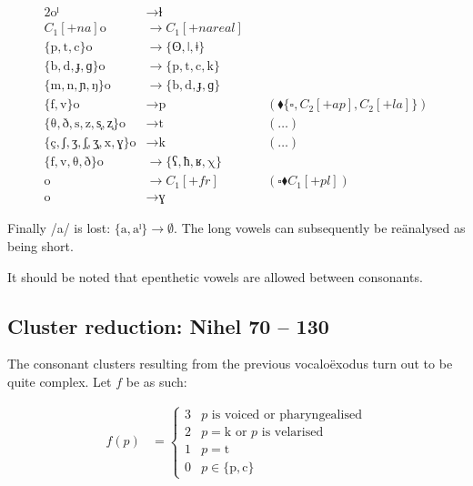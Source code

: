 \documentclass{book}
\begin{document}
\begin{alignat*}{2}
  \text{oˡ} &\rightarrow \text{ɫ} \\
  C_1[+na] \text{o} &\rightarrow C_1[+nareal] \\
  \{\text{p}, \text{t}, \text{c}\} \text{o} &\rightarrow
    \{\text{ʘ}, \text{ǀ}, \text{ǂ}\} \\
  \{\text{b}, \text{d}, \text{ɟ}, \text{ɡ}\} \text{o} &\rightarrow
    \{\text{p}, \text{t}, \text{c}, \text{k}\} \\
  \{\text{m}, \text{n}, \text{ɲ}, \text{ŋ}\} \text{o} &\rightarrow
    \{\text{b}, \text{d}, \text{ɟ}, \text{ɡ}\} \\
  \{\text{f}, \text{v}\} \text{o} &\rightarrow \text{p} &\quad(\blacklozenge \{\square, C_2[+ap], C_2[+la]\}) \\
  \{\text{θ}, \text{ð}, \text{s}, \text{z}, \text{s͎}, \text{z͎}\} \text{o} &\rightarrow \text{t} &\quad(\ldots) \\
  \{\text{ç}, \text{ʃ}, \text{ʒ}, \text{ʃ͎}, \text{ʒ͎}, \text{x}, \text{ɣ}\} \text{o} &\rightarrow \text{k} &\quad(\ldots) \\
  \{\text{f}, \text{v}, \text{θ}, \text{ð}\} \text{o} &\rightarrow
    \{\text{ʕ}, \text{ħ}, \text{ʁ}, \text{χ}\} \\
  \text{o} &\rightarrow C_1[+fr] &\quad(\square \blacklozenge C_1[+pl]) \\
  \text{o} &\rightarrow \text{ɣ}
\end{alignat*}

Finally /a/ is lost: $\{\text{a}, \text{aˡ}\} \rightarrow \emptyset$. The long vowels can subsequently be reänalysed as being short.

It should be noted that epenthetic vowels are allowed between consonants.

\subsection{Cluster reduction: Nihel 70 -- 130}

The consonant clusters resulting from the previous vocaloëxodus turn out to be quite complex. Let $f$ be as such:

\begin{align*}
  f(p) &=
  \begin{cases}
    3 & p \text{ is voiced or pharyngealised} \\
    2 & p = \text{k} \text{ or $p$ is velarised} \\
    1 & p = \text{t} \\
    0 & p \in \{\text{p}, \text{c}\}
  \end{cases}
\end{align*}
\end{document}
